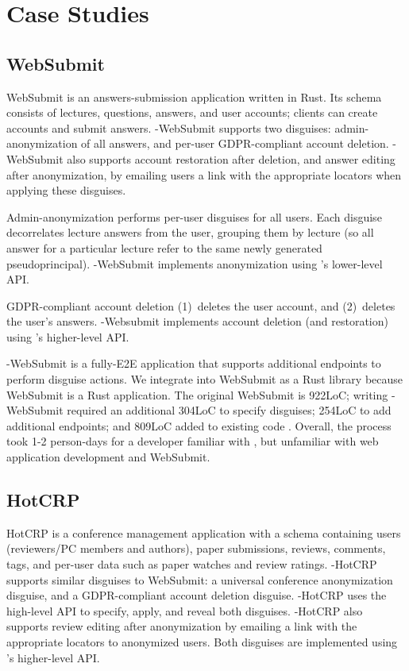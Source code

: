 \section{Case Studies}

\subsection{WebSubmit}
WebSubmit is an answers-submission application written in Rust. 
Its schema consists of lectures, questions, answers, and user accounts; 
clients can create accounts and submit answers. 
\sys-WebSubmit supports two disguises: admin-anonymization of all answers, and
per-user GDPR-compliant account deletion. \sys-WebSubmit also supports account restoration after
deletion, and answer editing after anonymization, by emailing users a link with the appropriate
locators when applying these disguises.
%

%
Admin-anonymization performs per-user disguises for all users.
Each disguise decorrelates lecture answers from the user, grouping them by lecture (so all answer
for a particular lecture refer to the same newly generated pseudoprincipal).
\sys-WebSubmit implements anonymization using \sys's lower-level API.
%

%
GDPR-compliant account deletion 
%
(1)~deletes the user account, and 
%
(2)~deletes the user's answers. 
\sys-Websubmit implements account deletion (and restoration) using \sys's higher-level API.
%

%
\sys-WebSubmit is a fully-E2E application that supports additional endpoints to perform disguise
actions. We integrate \sys into WebSubmit as a Rust library because
WebSubmit is a Rust application.
The original WebSubmit is 922LoC; writing \sys-WebSubmit required an additional 304LoC
to specify disguises; 254LoC to add additional endpoints; and 809LoC added to existing code
. Overall, the process took 1-2 person-days
for a developer familiar with \sys, but unfamiliar with web application development and
WebSubmit.

\subsection{HotCRP}
HotCRP is a conference management application with a schema containing users (reviewers/PC members and
authors), paper submissions, reviews, comments, tags, and per-user data such as paper watches and review ratings.
%
\sys-HotCRP supports similar disguises to WebSubmit: a universal conference anonymization disguise,
and a GDPR-compliant account deletion disguise.  \sys-HotCRP uses the high-level \sys API to
specify, apply, and reveal both disguises.  \sys-HotCRP also supports review editing after
anonymization by emailing a link with the appropriate locators to anonymized users. Both disguises
are implemented using \sys's higher-level API. 

